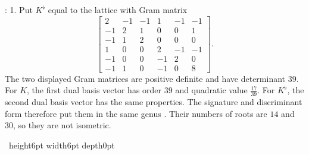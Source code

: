 \documentclass[leqno]{article}
\newcommand{\qed}{\hfill \vrule height6pt  width6pt depth0pt}
\newenvironment{proof}[1][]{\noindent {\it Proof #1} : }{\hbox{~}\qed
\smallskip
}
\numberwithin{equation}{section}
\begin{document}
\begin{proof}
1. Put $K^\flat$ equal to the lattice with Gram matrix
\[
\begin{bmatrix}
2&-1&-1&1&-1&-1\\
-1&2&1&0&0&1\\
-1&1&2&0&0&0\\
1&0&0&2&-1&-1\\
-1&0&0&-1&2&0\\
-1&1&0&-1&0&8
\end{bmatrix}.
\]
The two displayed Gram matrices are positive definite and have determinant $39$. For $K$, the first dual basis vector has order $39$ and quadratic value $\frac{17}{39}$. For $K^\flat$, the second dual basis vector has the same properties. The signature and discriminant form therefore put them in the same genus \cite[Corollary 1.9.4]{Nik80}. Their numbers of roots are $14$ and $30$, so they are not isometric.


\end{proof}
\end{document}
